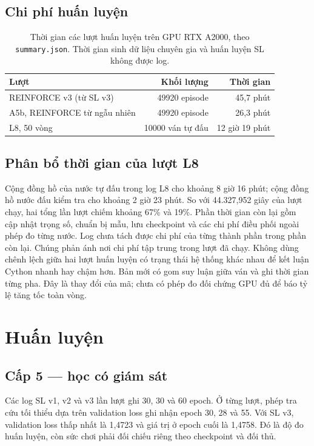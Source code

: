 \subsection{Chi phí huấn luyện}
\begin{table}[H]
\centering\small
\caption{Thời gian các lượt huấn luyện trên GPU RTX A2000, theo \texttt{summary.json}. Thời gian sinh dữ liệu chuyên gia và huấn luyện SL không được log.}
\label{tab:chi-phi-huan-luyen}
\begin{tabular}{@{}lrr@{}}
\toprule
Lượt & Khối lượng & Thời gian \\
\midrule
REINFORCE v3 (từ SL v3) & \num{49920} episode & 45{,}7 phút \\
A5b, REINFORCE từ ngẫu nhiên & \num{49920} episode & 26{,}3 phút \\
L8, 50 vòng & \num{10000} ván tự đấu & 12 giờ 19 phút \\
\bottomrule
\end{tabular}
\end{table}

\subsection{Phân bổ thời gian của lượt L8}
Cộng đồng hồ của nước tự đấu trong log L8 cho khoảng 8 giờ 16 phút; cộng đồng hồ nước đấu kiểm tra cho khoảng 2 giờ 23 phút. So với 44.327,952 giây của lượt chạy, hai tổng lần lượt chiếm khoảng 67\% và 19\%.
Phần thời gian còn lại gồm cập nhật trọng số, chuẩn bị mẫu, lưu checkpoint và các chi phí
điều phối ngoài phép đo từng nước. Log chưa tách được chi phí của từng thành phần trong phần còn lại. Chúng phản ánh nơi chi phí tập trung trong lượt đã chạy. Không dùng chênh lệch giữa hai lượt huấn luyện có trạng thái hệ thống khác nhau để kết luận Cython nhanh hay chậm hơn. Bản mới có gom suy luận giữa ván và ghi thời gian từng pha. Đây là thay đổi của mã; chưa có phép đo đối chứng GPU đủ để báo tỷ lệ tăng tốc toàn vòng.

\section{Huấn luyện}
\subsection{Cấp 5 --- học có giám sát}
Các log SL v1, v2 và v3 lần lượt ghi 30, 30 và 60 epoch. Ở từng lượt, phép tra cứu tối thiểu
dựa trên validation loss ghi nhận epoch 30, 28 và 55. Với SL v3, validation loss thấp nhất
là 1,4723 và giá trị ở epoch cuối là 1,4758. Đó là độ đo huấn luyện, còn sức chơi phải
đối chiếu riêng theo checkpoint và đối thủ.
\begin{table}[H]
\centering
\caption{Validation loss của ba lượt SL (trên) và đánh giá đối đầu từng checkpoint, 100 ván mỗi dòng (dưới).}
\label{tab:sl-checkpoint}

\end{table}
